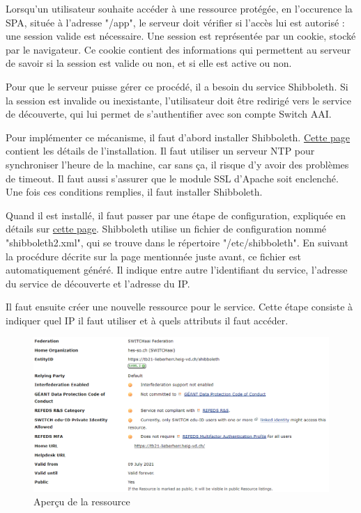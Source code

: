 \documentclass[
    iai, %
    eai, %
]{heig-tb}
\begin{document}
Lorsqu'un utilisateur souhaite accéder à une ressource protégée, en l'occurence la SPA, située à l'adresse "/app", le serveur doit vérifier si l'accès lui est autorisé : une session valide est nécessaire. Une session est représentée par un cookie, stocké par le navigateur. Ce cookie contient des informations qui permettent au serveur de savoir si la session est valide ou non, et si elle est active ou non.

Pour que le serveur puisse gérer ce procédé, il a besoin du service Shibboleth.
Si la session est invalide ou inexistante, l'utilisateur doit être redirigé vers le service de découverte, qui lui permet de s'authentifier avec son compte Switch AAI.


Pour implémenter ce mécanisme, il faut d'abord installer Shibboleth. \href{https://www.switch.ch/aai/guides/sp/installation/}{Cette page} contient les détails de l'installation.
Il faut utiliser un serveur NTP pour synchroniser l'heure de la machine, car sans ça, il risque d'y avoir des problèmes de timeout. Il faut aussi s'assurer que le module SSL d'Apache soit enclenché.
Une fois ces conditions remplies, il faut installer Shibboleth.

Quand il est installé, il faut passer par une étape de configuration, expliquée en détails sur \href{https://www.switch.ch/aai/guides/sp/configuration/}{cette page}.
Shibboleth utilise un fichier de configuration nommé "shibboleth2.xml", qui se trouve dans le répertoire "/etc/shibboleth". En suivant la procédure décrite sur la page mentionnée juste avant, ce fichier est automatiquement généré. Il indique entre autre l'identifiant du service, l'adresse du service de découverte et l'adresse du IP.

\newpage
Il faut ensuite créer une nouvelle ressource pour le service. Cette étape consiste à indiquer quel IP il faut utiliser et à quels attributs il faut accéder.

\begin{figure}[h]
  \includegraphics[width=14cm]{registry1.PNG}
  \caption{Aperçu de la ressource}
\end{figure}
\end{document}
